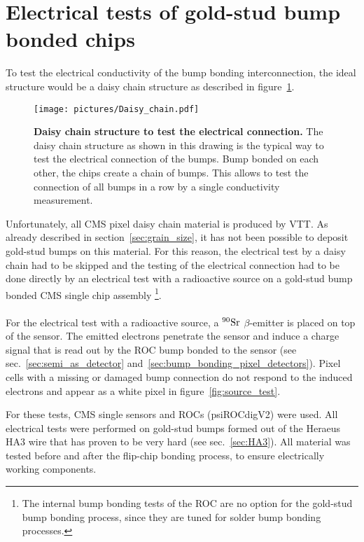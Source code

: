 \section{Electrical tests of gold-stud bump bonded chips}\label{sec:electrical_test}
To test the electrical conductivity of the bump bonding interconnection, the ideal structure would be a daisy chain structure as described in figure~\ref{pic:daisy_chain}.
\begin{figure}
\begin{center}
\texttt{[image: pictures/Daisy\_chain.pdf]}
\end{center}
\caption[Daisy chain structure to test the electrical connection]{\textbf{Daisy chain structure to test the electrical connection.} The daisy chain structure as shown in this drawing is the typical way to test the electrical connection of the bumps. Bump bonded on each other, the chips create a chain of bumps. This allows to test the connection of all bumps in a row by a single conductivity measurement.}\label{pic:daisy_chain}
\end{figure}
Unfortunately, all \ac{CMS} pixel daisy chain material is produced by \ac{VTT}. As already described in section~\ref{sec:grain_size}, it has not been possible to deposit gold-stud bumps on this material. For this reason, the electrical test by a daisy chain had to be skipped and the testing of the electrical connection had to be done directly by an electrical test with a radioactive source on a gold-stud bump bonded \ac{CMS} single chip assembly \footnote{The internal bump bonding tests of the \ac{ROC} are no option for the gold-stud bump bonding process, since they are tuned for solder bump bonding processes.}.
\\
\\For the electrical test with a radioactive source, a $^{90}\rm{Sr}$ $\beta$-emitter is placed on top of the sensor. The emitted electrons penetrate the sensor and induce a charge signal that is read out by the \ac{ROC} bump bonded to the sensor (see sec.~\ref{sec:semi_as_detector} and~\ref{sec:bump_bonding_pixel_detectors}). Pixel cells with a missing or damaged bump connection do not respond to the induced electrons and appear as a white pixel in figure~\ref{fig:source_test}.

For these tests, \ac{CMS} single sensors and \ac{ROC}s (psiROCdigV2) were used. All electrical tests were performed on gold-stud bumps formed out of the Heraeus HA3 wire that has proven to be very hard (see sec.~\ref{sec:HA3}). All material was tested before and after the flip-chip bonding process, to ensure electrically working components.

